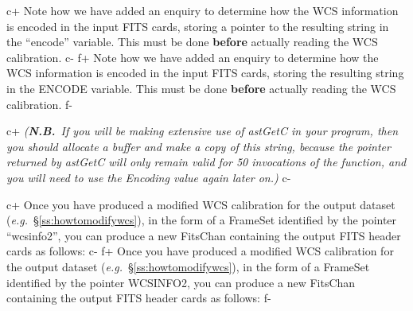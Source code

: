 \documentclass[twoside,11pt]{starlink}
\providecommand{\secref}[1]{\S\ref{#1}}
\begin{document}
c+
Note how we have added an enquiry to determine how the WCS information
is encoded in the input FITS cards, storing a pointer to the resulting
string in the ``encode'' variable. This must be done \textbf{before}
actually reading the WCS calibration.
c-
f+
Note how we have added an enquiry to determine how the WCS information
is encoded in the input FITS cards, storing the resulting string in
the ENCODE variable. This must be done \textbf{before} actually reading
the WCS calibration.
f-

c+
\emph{(\textbf{N.B.}\ If you will be making extensive use of astGetC in
your program, then you should allocate a buffer and make a copy of
this string, because the pointer returned by astGetC will only remain
valid for 50 invocations of the function, and you will need to use the
Encoding value again later on.)}
c-

c+
Once you have produced a modified WCS calibration for the output
dataset (\emph{e.g.}\ \secref{ss:howtomodifywcs}), in the form of a
FrameSet identified by the pointer ``wcsinfo2'', you can produce a new
FitsChan containing the output FITS header cards as follows:
c-
f+
Once you have produced a modified WCS calibration for the output
dataset (\emph{e.g.}\ \secref{ss:howtomodifywcs}), in the form of a
FrameSet identified by the pointer WCSINFO2, you can produce a new
FitsChan containing the output FITS header cards as follows:
f-
\end{document}
